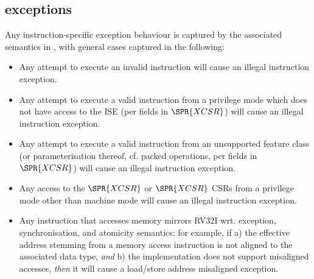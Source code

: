 \subsection{\XCID exceptions}
\label{sec:spec:exceptions}


Any instruction-specific exception behaviour is captured by the associated
semantics in , with general cases captured in
the following:

\begin{itemize}
\item Any attempt to execute an
      invalid \XCID instruction
      will cause an 
      illegal instruction exception.
\item Any attempt to execute a
        valid \XCID instruction
      from a privilege mode which does not have access to the ISE
      (per fields in $\SPR{XCSR}$)
      will cause an
      illegal instruction exception.
\item Any attempt to execute a
        valid \XCID instruction
      from an unsupported feature class (or parameterisation thereof, cf. packed operations, per fields in $\SPR{XCSR}$)
      will cause an 
      illegal instruction exception.
\item Any access to the 
      $\SPR{XCSR}$ or $\SPR{XCSR}$
      CSRs from a privilege mode other than machine mode
      will cause an 
      illegal instruction exception.
\item Any instruction that accesses memory mirrors RV32I wrt. exception,
      synchronisation, and atomicity semantics: for example, if
      a) the effective address stemming from a memory access instruction
         is not aligned to the associated data type, 
         {\em  and}
      b) the implementation does not support misaligned accesses,
         {\em then}
         it will cause a 
         load/store address misaligned exception.
\end{itemize}


